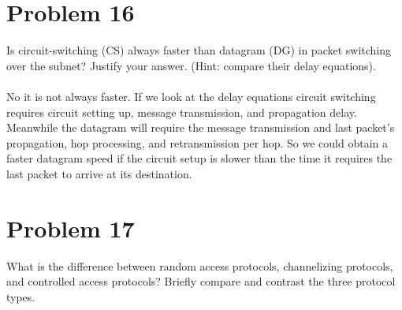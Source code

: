 \documentclass{article}
\begin{document}
\section*{Problem 16}
Is circuit-switching (CS) always faster than datagram (DG) in packet switching over the
subnet? Justify your answer. (Hint: compare their delay equations).\\\\

No it is not always faster. If we look at the delay equations circuit switching 
requires circuit setting up, message transmission, and propagation delay. Meanwhile 
the datagram will require the message transmission and last packet's propagation, 
hop processing, and retransmission per hop. So we could obtain a faster datagram 
speed if the circuit setup is slower than the time it requires the last packet 
to arrive at its destination.\\


\section*{Problem 17}
What is the difference between random access protocols, channelizing protocols, and
controlled access protocols? Briefly compare and contrast the three protocol types.\\
\end{document}
